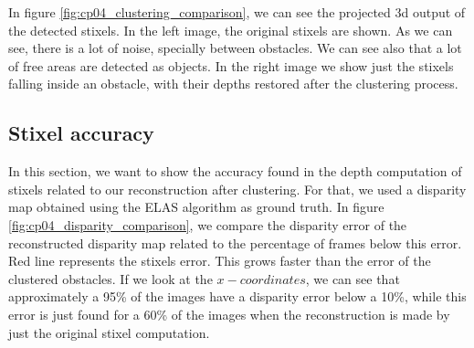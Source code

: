 In figure \ref{fig:cp04_clustering_comparison}, we can see the projected 3d output of the detected stixels. In the left image, the original stixels are shown. As we can see, there is a lot of noise, specially between obstacles. We can see also that a lot of free areas are detected as objects. In the right image we show just the stixels falling inside an obstacle, with their depths restored after the clustering process.

\subsection{Stixel accuracy}\label{ch:chapter04_02_02}

In this section, we want to show the accuracy found in the depth computation of stixels related to our reconstruction after clustering. For that, we used a disparity map obtained using the \ac{ELAS} algorithm as ground truth. In figure \ref{fig:cp04_disparity_comparison}, we compare the disparity error of the reconstructed disparity map related to the percentage of frames below this error. Red line represents the stixels error. This grows faster than the error of the clustered obstacles. If we look at the $x-coordinates$, we can see that approximately a 95\% of the images have a disparity error below a 10\%, while this error is just found for a 60\% of the images when the reconstruction is made by just the original stixel computation.

